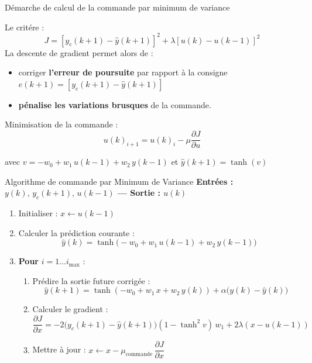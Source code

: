 \documentclass[aspectratio=169,12pt]{beamer}
\begin{document}
	\begin{frame}{\color{red}Démarche de calcul de la commande par minimum de variance}
		
		Le critére :
		$$J = [y_c(k+1) - \hat{y}(k+1)]^2 + \lambda[u(k)-u(k-1)]^2$$
		La descente de gradient permet alors de :
		\begin{itemize}
			\item corriger \textbf{l'erreur de poursuite} par rapport à la consigne $e(k+1) = [y_c(k+1) - \hat{y}(k+1)]$
			\item \textbf{pénalise les variations brusques} de la commande.
		\end{itemize}
		Minimisation de la commande :
		$$u(k)_{i+1} = u(k)_i - \mu \frac{\partial J}{\partial u}$$
		
		avec $v = -w_0 + w_1\,u(k-1) + w_2\,y(k-1)$
		\quad et \quad $\hat{y}(k+1) = \tanh(v)$\\[6pt]	
	\end{frame}
	\begin{frame}{\color{red}Algorithme de commande par Minimum de Variance}
		\textbf{Entrées : $y(k),\, y_c(k+1),\, u(k-1)$ — Sortie : $u(k)$}
		\vspace{1pt}
		\begin{enumerate}
			\item Initialiser : $x \leftarrow u(k-1)$
			\item Calculer la prédiction courante :
			\[
			\hat{y}(k) = \tanh\bigl(-w_0 + w_1\,u(k-1) + w_2\,y(k-1)\bigr)
			\]
			\item \textbf{Pour} $i = 1 \dots i_{\max}$ :
			\begin{enumerate}
				\small
				\item Prédire la sortie future corrigée :
				\[
				\hat{y}(k+1) = \tanh(-w_0 + w_1\,x + w_2\,y(k)) + \alpha\bigl(y(k)-\hat{y}(k)\bigr)
				\]
				\item Calculer le gradient :
				\[
				\frac{\partial J}{\partial x} = -2\bigl(y_c(k+1)-\hat{y}(k+1)\bigr)(1-\tanh^2 v)\,w_1 + 2\lambda(x-u(k-1))
				\]
				\item Mettre à jour : $x \leftarrow x - \mu_{\text{commande}}\,\dfrac{\partial J}{\partial x}$
			\end{enumerate}
		\end{enumerate}
	\end{frame}
\end{document}
